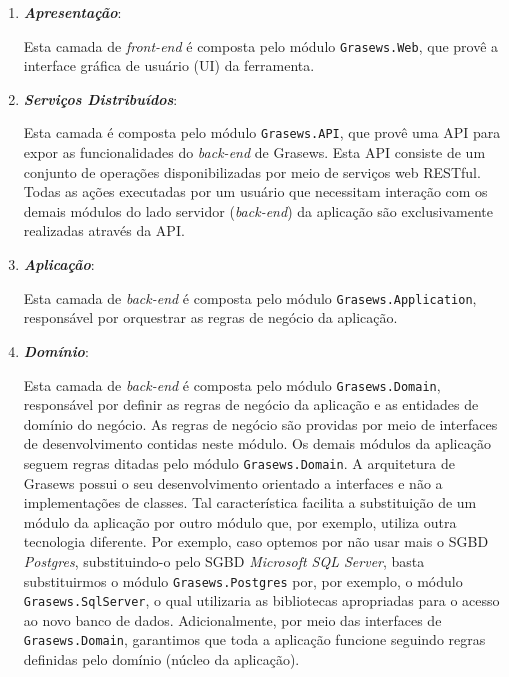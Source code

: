 \begin{enumerate}

  \item
  \textit{\textbf{Apresentação}}:
  
  Esta camada de \textit{front-end} é composta pelo módulo \texttt{Grasews.Web}, que provê a interface gráfica de usuário (UI) da ferramenta.
  
  \item
  \textit{\textbf{Serviços Distribuídos}}:
  
  Esta camada é composta pelo módulo \texttt{Grasews.API}, que provê uma API para expor as funcionalidades do \textit{back-end} de Grasews. Esta API consiste de um conjunto de operações disponibilizadas por meio de serviços web RESTful. Todas as ações executadas por um usuário que necessitam interação com os demais módulos do lado servidor (\textit{back-end}) da aplicação são exclusivamente realizadas através da API.
  
  \item
  \textit{\textbf{Aplicação}}:
  
  Esta camada de \textit{back-end} é composta pelo módulo \texttt{Grasews.Application}, responsável por orquestrar as regras de negócio da aplicação.
  
  \item
  \textit{\textbf{Domínio}}:
  
  Esta camada de \textit{back-end} é composta pelo módulo \texttt{Grasews.Domain}, responsável por definir as regras de negócio da aplicação e as entidades de domínio do negócio. As regras de negócio são providas por meio de interfaces de desenvolvimento contidas neste módulo. Os demais módulos da aplicação seguem regras ditadas pelo módulo \texttt{Grasews.Domain}. A arquitetura de Grasews possui o seu desenvolvimento orientado a interfaces e não a implementações de classes. Tal característica facilita a substituição de um módulo da aplicação por outro módulo que, por exemplo, utiliza outra tecnologia diferente. Por exemplo, caso optemos por não usar mais o SGBD \textit{Postgres}, substituindo-o pelo SGBD \textit{Microsoft SQL Server}\cite{SQLSERVER-2019}, basta substituirmos o módulo \texttt{Grasews.Postgres} por, por exemplo, o módulo \texttt{Grasews.SqlServer}, o qual utilizaria as bibliotecas apropriadas para o acesso ao novo banco de dados. Adicionalmente, por meio das interfaces de  \texttt{Grasews.Domain}, garantimos que toda a aplicação funcione seguindo regras definidas pelo domínio (núcleo da aplicação).
  

\end{enumerate}
